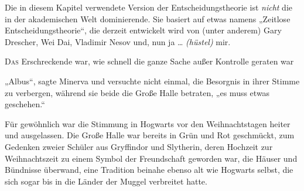 
\begin{chapterOpeningAuthorNote}
%
Die in diesem Kapitel verwendete Version der Entscheidungstheorie ist \emph{nicht} die in der akademischen Welt dominierende. Sie basiert auf etwas namens
„Zeitlose Entscheidungstheorie“, die derzeit entwickelt wird von (unter anderem) Gary Drescher, Wei Dai, Vladimir Nesov und, nun ja … \emph{(hüstel)} mir.
\end{chapterOpeningAuthorNote}

\lettrine{D}{as} Erschreckende war, wie schnell die ganze Sache außer Kontrolle geraten war

„Albus“, sagte Minerva und versuchte nicht einmal, die Besorgnis in ihrer Stimme zu verbergen, während sie beide die Große Halle betraten, „es muss etwas geschehen.“

Für gewöhnlich war die Stimmung in Hogwarts vor den Weihnachtstagen heiter und ausgelassen. Die Große Halle war bereits in Grün und Rot geschmückt, zum Gedenken zweier Schüler aus Gryffindor und Slytherin, deren Hochzeit zur Weihnachtszeit zu einem Symbol der Freundschaft geworden war, die Häuser und Bündnisse überwand, eine Tradition beinahe ebenso alt wie Hogwarts selbst, die sich sogar bis in die Länder der Muggel verbreitet hatte.%

